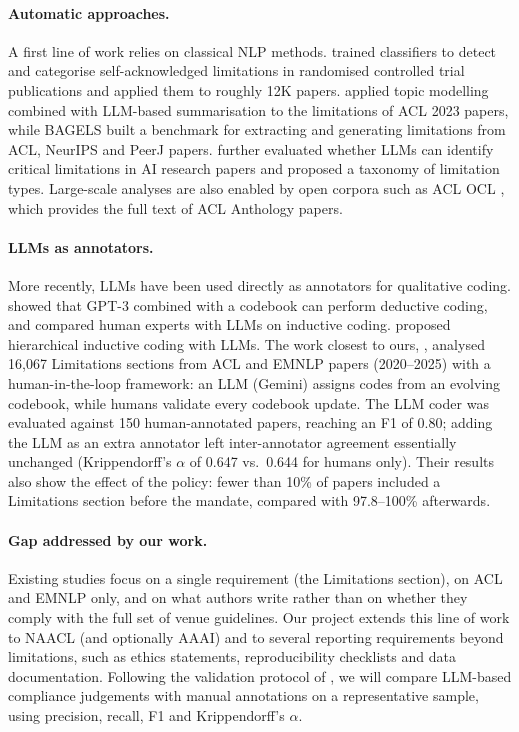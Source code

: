 \documentclass[11pt]{article}
\begin{document}
\paragraph{Automatic approaches.}
A first line of work relies on classical NLP methods.  trained classifiers to detect and categorise self-acknowledged limitations in randomised controlled trial publications and applied them to roughly 12K papers.  applied topic modelling combined with LLM-based summarisation to the limitations of ACL 2023 papers, while BAGELS \cite{alazher2025bagels} built a benchmark for extracting and generating limitations from ACL, NeurIPS and PeerJ papers.  further evaluated whether LLMs can identify critical limitations in AI research papers and proposed a taxonomy of limitation types. Large-scale analyses are also enabled by open corpora such as ACL OCL \cite{rohatgi2023acl}, which provides the full text of ACL Anthology papers.

\paragraph{LLMs as annotators.}
More recently, LLMs have been used directly as annotators for qualitative coding.  showed that GPT-3 combined with a codebook can perform deductive coding, and  compared human experts with LLMs on inductive coding.  proposed hierarchical inductive coding with LLMs. The work closest to ours, , analysed 16,067 Limitations sections from ACL and EMNLP papers (2020--2025) with a human-in-the-loop framework: an LLM (Gemini) assigns codes from an evolving codebook, while humans validate every codebook update. The LLM coder was evaluated against 150 human-annotated papers, reaching an F1 of 0.80; adding the LLM as an extra annotator left inter-annotator agreement essentially unchanged (Krippendorff's $\alpha$ of 0.647 vs.\ 0.644 for humans only). Their results also show the effect of the policy: fewer than 10\% of papers included a Limitations section before the mandate, compared with 97.8--100\% afterwards.

\paragraph{Gap addressed by our work.}
Existing studies focus on a single requirement (the Limitations section), on ACL and EMNLP only, and on what authors write rather than on whether they comply with the full set of venue guidelines. Our project extends this line of work to NAACL (and optionally AAAI) and to several reporting requirements beyond limitations, such as ethics statements, reproducibility checklists and data documentation. Following the validation protocol of , we will compare LLM-based compliance judgements with manual annotations on a representative sample, using precision, recall, F1 and Krippendorff's $\alpha$.
\end{document}
